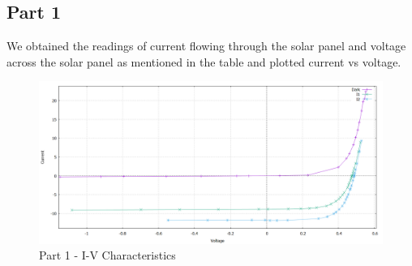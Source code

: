 \documentclass[12pt]{article}
\begin{document}
\subsection{Part 1}

We obtained the readings of current flowing through the solar panel and voltage across the solar panel as mentioned in the table and plotted current vs voltage.

\begin{figure}[H]
	\centering
	\includegraphics[width = \linewidth, trim = {0 0 0 0}, clip]{Part1.png}
	\caption{Part 1 - I-V Characteristics}
\end{figure}
\end{document}

